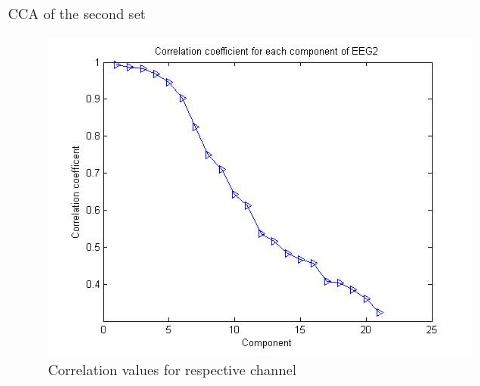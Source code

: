 \documentclass[t,12pt,english
\ifx\beamermode\undefined\else,\beamermode\fi
]{beamer}
\begin{document}
\begin{frame}{CCA of the second set}
\begin{figure}[!htbp]
\includegraphics[width=1\textwidth]{8.jpg}\\
\tiny{Correlation values for respective channel}
\endminipage\hfill
\end{figure}

\end{frame} 
    
\end{document}

